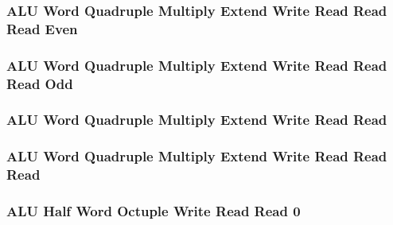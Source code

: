 

\subsubsection[{\small ALU Word Quadruple Multiply Extend Write Read Read Read Even}]{ALU Word Quadruple Multiply Extend Write Read Read Read Even} \label{sec:format-ALU-WQMEWRRRE}



\subsubsection[{\small ALU Word Quadruple Multiply Extend Write Read Read Read Odd}]{ALU Word Quadruple Multiply Extend Write Read Read Read Odd} \label{sec:format-ALU-WQMEWRRRO}



\subsubsection[{\small ALU Word Quadruple Multiply Extend Write Read Read}]{ALU Word Quadruple Multiply Extend Write Read Read} \label{sec:format-ALU-WQMXWRR}



\subsubsection[{\small ALU Word Quadruple Multiply Extend Write Read Read Read}]{ALU Word Quadruple Multiply Extend Write Read Read Read} \label{sec:format-ALU-WQMXWRRR}



\subsubsection[{\small ALU Half Word Octuple Write Read Read 0}]{ALU Half Word Octuple Write Read Read 0} \label{sec:format-ALU-HOWRR0}

